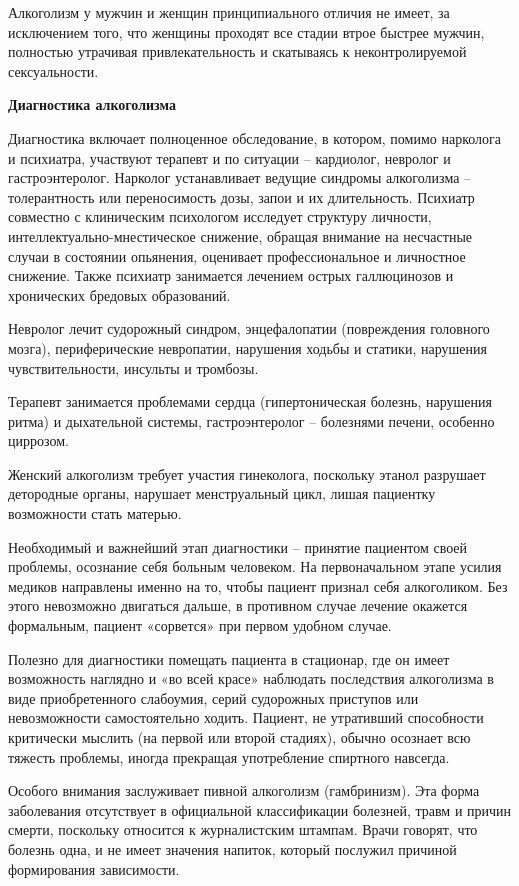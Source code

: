 Алкоголизм у мужчин и женщин принципиального отличия не имеет, за исключением того, что женщины проходят все стадии втрое быстрее мужчин, полностью утрачивая привлекательность и скатываясь к неконтролируемой сексуальности.

\textbf{Диагностика алкоголизма}

Диагностика включает полноценное обследование, в котором, помимо нарколога и психиатра, участвуют терапевт и по ситуации – кардиолог, невролог и гастроэнтеролог. Нарколог устанавливает ведущие синдромы алкоголизма – толерантность или переносимость дозы, запои и их длительность. Психиатр совместно с клиническим психологом исследует структуру личности, интеллектуально-мнестическое снижение, обращая внимание на несчастные случаи в состоянии опьянения, оценивает профессиональное и личностное снижение. Также психиатр занимается лечением острых галлюцинозов и хронических бредовых образований.

Невролог лечит судорожный синдром, энцефалопатии (повреждения головного мозга), периферические невропатии, нарушения ходьбы и статики, нарушения чувствительности, инсульты и тромбозы.

Терапевт занимается проблемами сердца (гипертоническая болезнь, нарушения ритма) и дыхательной системы, гастроэнтеролог – болезнями печени, особенно циррозом.

Женский алкоголизм требует участия гинеколога, поскольку этанол разрушает детородные органы, нарушает менструальный цикл, лишая пациентку возможности стать матерью.

Необходимый и важнейший этап диагностики – принятие пациентом своей проблемы, осознание себя больным человеком. На первоначальном этапе усилия медиков направлены именно на то, чтобы пациент признал себя алкоголиком. Без этого невозможно двигаться дальше, в противном случае лечение окажется формальным, пациент «сорвется» при первом удобном случае.

Полезно для диагностики помещать пациента в стационар, где он имеет возможность наглядно и «во всей красе» наблюдать последствия алкоголизма в виде приобретенного слабоумия, серий судорожных приступов или невозможности самостоятельно ходить. Пациент, не утративший способности критически мыслить (на первой или второй стадиях), обычно осознает всю тяжесть проблемы, иногда прекращая употребление спиртного навсегда.

Особого внимания заслуживает пивной алкоголизм (гамбринизм). Эта форма заболевания отсутствует в официальной классификации болезней, травм и причин смерти, поскольку относится к журналистским штампам. Врачи говорят, что болезнь одна, и не имеет значения напиток, который послужил причиной формирования зависимости.

